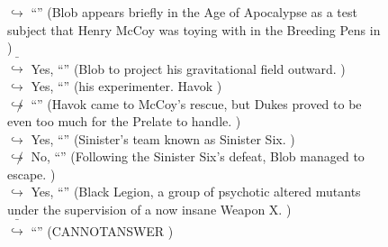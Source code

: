 \documentclass[11pt,a4paper, onecolumn]{article}
\begin{document}
\begin{figure}[t] \small \begin{tcolorbox}[boxsep=0pt,left=5pt,right=0pt,top=2pt,colback = yellow!5] \begin{dialogue}
 \small 
\colorbox{pink!25}{$\hookrightarrow$}
{ ``'' (Blob appears briefly in the Age of Apocalypse as a test subject that Henry McCoy was toying with in the Breeding Pens in ) }
\\
\colorbox{pink!25}{ $\bar{\hookrightarrow}$}
\colorbox{red!25}{Yes,}
{ ``'' (Blob to project his gravitational field outward. ) }
\\
\colorbox{pink!25}{$\hookrightarrow$}
\colorbox{red!25}{Yes,}
{ ``'' (his experimenter. Havok ) }
\\
\colorbox{pink!25}{$\not\hookrightarrow$}
{ ``'' (Havok came to McCoy's rescue, but Dukes proved to be even too much for the Prelate to handle. ) }
\\
\colorbox{pink!25}{$\hookrightarrow$}
\colorbox{red!25}{Yes,}
{ ``'' (Sinister's team known as Sinister Six. ) }
\\
\colorbox{pink!25}{$\not\hookrightarrow$}
\colorbox{red!25}{No,}
{ ``'' (Following the Sinister Six's defeat, Blob managed to escape. ) }
\\
\colorbox{pink!25}{$\hookrightarrow$}
\colorbox{red!25}{Yes,}
{ ``'' (Black Legion, a group of psychotic altered mutants under the supervision of a now insane Weapon X. ) }
\\
\colorbox{pink!25}{ $\bar{\hookrightarrow}$}
{ ``'' (CANNOTANSWER ) }
\\
 \end{dialogue}\end{tcolorbox}\end{figure}
\end{document}
